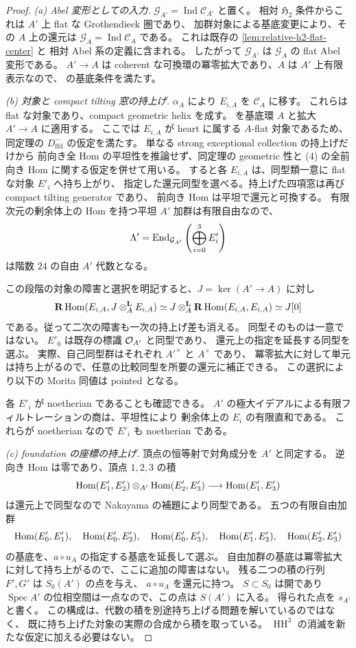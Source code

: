 \begin{proof}
\emph{(a) Abel 変形としての入力.}
$\mathcal G_{A'}=\operatorname{Ind}\mathcal C_{A'}$ と置く。
相対 $\mathfrak H_2$ 条件からこれは $A'$ 上 flat な Grothendieck 圏であり、
加群対象による基底変更により、その $A$ 上の還元は
$\mathcal G_A=\operatorname{Ind}\mathcal C_A$ である。
これは既存の \ref{lem:relative-h2-flat-center} と
相対 Abel 系の定義に含まれる。
したがって $\mathcal G_{A'}$ は $\mathcal G_A$ の flat Abel 変形である。
$A'\to A$ は coherent な可換環の冪零拡大であり、$A$ は $A'$ 上有限表示なので、
\cite[\S4.1]{DeDekenLowen2011} の基底条件を満たす。

\emph{(b) 対象と compact tilting 窓の持上げ.}
$\alpha_A$ により $E_{i,A}$ を $\mathcal C_A$ に移す。
これらは flat な対象であり、compact geometric helix を成す。
\cite[Theorem 5.13(1)--(4)]{DeDekenLowen2011} を基底環 $A$ と拡大 $A'\to A$ に適用する。
ここでは $E_{i,A}$ が heart に属する $A$-flat 対象であるため、
同定理の $D^-_{\mathrm{ffd}}$ の仮定を満たす。
単なる strong exceptional collection の持上げだけから
前向き全 Hom の平坦性を推論せず、同定理の geometric 性と
(4) の全前向き Hom に関する仮定を併せて用いる。
すると各 $E_{i,A}$ は、同型類一意に flat な対象 $E'_{i}$ へ持ち上がり、
指定した還元同型を選べる。持上げた四項窓は再び compact tilting generator であり、
前向き Hom は平坦で還元と可換する。
有限次元の剰余体上の Hom を持つ平坦 $A'$ 加群は有限自由なので、
\[
 \Lambda' =\operatorname{End}_{\mathcal G_{A'}}
       \left(\bigoplus_{i=0}^3 E'_i\right)
\]
は階数 $24$ の自由 $A'$ 代数となる。

この段階の対象の障害と選択を明記すると、$J=\ker(A'\to A)$ に対し
\[
 \mathbf R\operatorname{Hom}(E_{i,A},J\otimes_A^{\mathbf L}E_{i,A})
 \simeq J\otimes_A^{\mathbf L}\mathbf R\operatorname{Hom}(E_{i,A},E_{i,A})
 \simeq J[0]
\]
である。従って二次の障害も一次の持上げ差も消える。
同型そのものは一意ではない。
$E'_0$ は既存の標識 $\mathcal O_{A'}$ と同型であり、
還元上の指定を延長する同型を選ぶ。
実際、自己同型群はそれぞれ $A'^\times$ と $A^\times$ であり、
冪零拡大に対して単元は持ち上がるので、任意の比較同型を所要の還元に補正できる。
この選択により以下の Morita 同値は pointed となる。

各 $E'_i$ が noetherian であることも確認できる。
$A'$ の極大イデアルによる有限フィルトレーションの商は、平坦性により
剰余体上の $E_i$ の有限直和である。
これらが noetherian なので $E'_i$ も noetherian である。

\emph{(c) foundation の座標の持上げ.}
頂点の恒等射で対角成分を $A'$ と同定する。
逆向き Hom は零であり、頂点 $1,2,3$ の積
\[
 \operatorname{Hom}(E'_1,E'_2)\otimes_{A'}\operatorname{Hom}(E'_2,E'_3)
       \longrightarrow\operatorname{Hom}(E'_1,E'_3)
\]
は還元上で同型なので Nakayama の補題により同型である。
五つの有限自由加群
\[
 \operatorname{Hom}(E'_0,E'_1),\quad\operatorname{Hom}(E'_0,E'_2),\quad\operatorname{Hom}(E'_0,E'_3),
 \quad\operatorname{Hom}(E'_1,E'_2),\quad\operatorname{Hom}(E'_2,E'_3)
\]
の基底を、$a\circ u_A$ の指定する基底を延長して選ぶ。
自由加群の基底は冪零拡大に対して持ち上がるので、ここに追加の障害はない。
残る二つの積の行列 $F',G'$ は $S_0(A')$ の点を与え、
$a\circ u_A$ を還元に持つ。
$S\subset S_0$ は開であり $\operatorname{Spec} A'$ の位相空間は一点なので、この点は $S(A')$ に入る。
得られた点を $s_{A'}$ と書く。
この構成は、代数の積を別途持ち上げる問題を解いているのではなく、
既に持ち上げた対象の実際の合成から積を取っている。
$\operatorname{HH}^3$ の消滅を新たな仮定に加える必要はない。


\end{proof}
